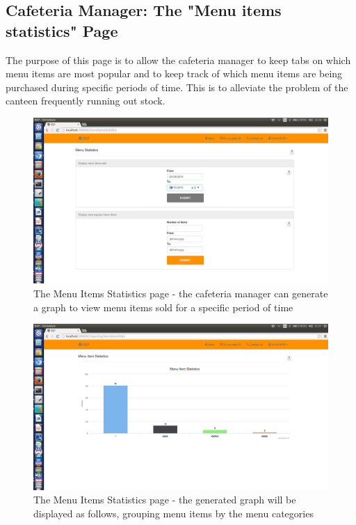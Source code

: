 \documentclass[a4paper,12pt]{report}
\begin{document}
\subsection{Cafeteria Manager: The "Menu items statistics" Page}
The purpose of this page is to allow the cafeteria manager to keep tabs on which menu items are most popular and to keep track of which menu items are being purchased during specific periods of time. This is to alleviate the problem of the canteen frequently running out stock.

\begin{figure}[H]
  \centering
    \includegraphics[width=1.0\textwidth]{screenshots/menuStats1.png}
    \caption{The Menu Items Statistics page - the cafeteria manager can generate a graph to view menu items sold for a specific period of time}
\end{figure}

\begin{figure}[H]
  \centering
    \includegraphics[width=1.0\textwidth]{screenshots/menuStats2.png}
    \caption{The Menu Items Statistics page - the generated graph will be displayed as follows, grouping menu items by the menu categories}
\end{figure}
\end{document}
